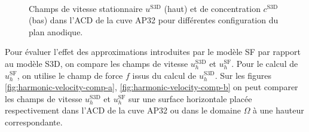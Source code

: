 \begin{figure}[h]
\begin{center}
    \begin{multicols}{2}
        \\
    \end{multicols}

    \caption{Champs de vitesse stationnaire $u^{\mathrm{S3D}}$ (haut) et de
      concentration $c^\mathrm{S3D}$ (bas) dans l'ACD de la cuve
      AP32 pour différentes configuration du plan anodique.}
    \label{fig:f3d-deactivated-b}
  \end{center}
\end{figure}

Pour évaluer l'effet des approximations introduites par le modèle
SF par rapport au modèle S3D, on compare les champs de vitesse
$u_h^{\mathrm{S3D}}$ et $u_h^{\mathrm{SF}}$. Pour le calcul de
$u_h^{\mathrm{SF}}$, on utilise le champ de force $f$ issus du calcul de
$u_h^{\mathrm{S3D}}$. Sur les figures \ref{fig:harmonic-velocity-comp-a}, \ref{fig:harmonic-velocity-comp-b}
on peut comparer les champs de vitesse $u_h^{\mathrm{S3D}}$ et
$u_h^\mathrm{SF}$ sur une surface horizontale placée respectivement
dans l'ACD de la cuve AP32 ou dans le domaine $\Omega$ à une hauteur
correspondante.

